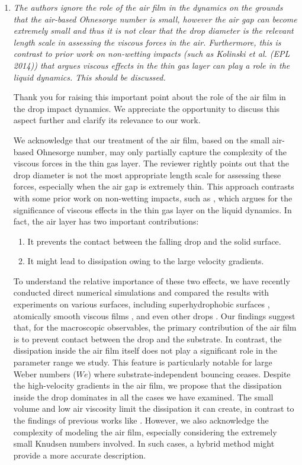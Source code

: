 \documentclass[]{article}
\begin{document}
\begin{enumerate}
	\item \textit{The authors ignore the role of the air film in the dynamics on the grounds that the air-based Ohnesorge number is small, however the air gap can become extremely small and thus it is not clear that the drop diameter is the relevant length scale in assessing the viscous forces in the air. Furthermore, this is contrast to prior work on non-wetting impacts (such as Kolinski et al. (EPL 2014)) that argues viscous effects in the thin gas layer can play a role in the liquid dynamics. This should be discussed.}
	
	Thank you for raising this important point about the role of the air film in the drop impact dynamics. We appreciate the opportunity to discuss this aspect further and clarify its relevance to our work.
	
	We acknowledge that our treatment of the air film, based on the small air-based Ohnesorge number, may only partially capture the complexity of the viscous forces in the thin gas layer. The reviewer rightly points out that the drop diameter is not the most appropriate length scale for assessing these forces, especially when the air gap is extremely thin. This approach contrasts with some prior work on non-wetting impacts, such as \citet{kolinski-2014-epl}, which argues for the significance of viscous effects in the thin gas layer on the liquid dynamics. In fact, the air layer has two important contributions: 
	
	\begin{enumerate}
		\item It prevents the contact between the falling drop and the solid surface. 
		\item It might lead to dissipation owing to the large velocity gradients. 
	\end{enumerate}
	
	To understand the relative importance of these two effects, we have recently conducted direct numerical simulations and compared the results with experiments on various surfaces, including superhydrophobic surfaces \citep{sanjay_chantelot_lohse_2023}, atomically smooth viscous films \citep{sanjay2023drop}, and even other drops \citep{ramirez2020lifting}. Our findings suggest that, for the macroscopic observables, the primary contribution of the air film is to prevent contact between the drop and the substrate. In contrast, the dissipation inside the air film itself does not play a significant role in the parameter range we study. This feature is particularly notable for large Weber numbers ($We$) where substrate-independent bouncing ceases.
	Despite the high-velocity gradients in the air film, we propose that the dissipation inside the drop dominates in all the cases we have examined. The small volume and low air viscosity limit the dissipation it can create, in contrast to the findings of previous works like \citet{kolinski-2014-epl}. However, we also acknowledge the complexity of modeling the air film, especially considering the extremely small Knudsen numbers involved. In such cases, a hybrid method \citep{chubynsky-2020-prl, sprittles2024gas} might provide a more accurate description.
	

\end{enumerate}
\end{document}
